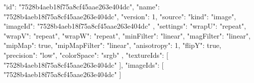 {
  "id": "7528b4aeb18f75a8cf45aae263e404dc",
  "name": "7528b4aeb18f75a8cf45aae263e404dc",
  "version": 1,
  "source": {
    "kind": "image",
    "imageId": "7528b4aeb18f75a8cf45aae263e404dc"
  },
  "settings": {
    "wrapU": "repeat",
    "wrapV": "repeat",
    "wrapW": "repeat",
    "minFilter": "linear",
    "magFilter": "linear",
    "mipMap": true,
    "mipMapFilter": "linear",
    "anisotropy": 1,
    "flipY": true,
    "precision": "low",
    "colorSpace": "srgb"
  },
  "textureIds": [
    "7528b4aeb18f75a8cf45aae263e404dc"
  ],
  "imageIds": [
    "7528b4aeb18f75a8cf45aae263e404dc"
  ]
}
